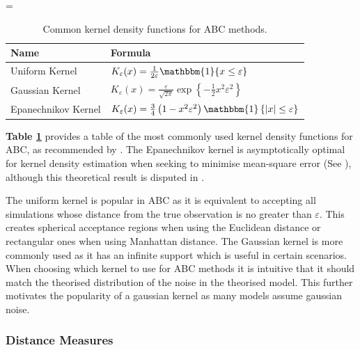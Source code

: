 \documentclass[11pt,a4paper]{article}
\theoremstyle{break}
\begin{document}
  \begin{table}[H]
    \everymath={\displaystyle}
    \centering
    \begin{tabular}{|l|l|}
      \hline
      \textbf{Name}&\textbf{Formula}\\\hline
      Uniform Kernel&$K_\varepsilon(x)=\frac1{2\varepsilon}\mathbbm{1}\{x\leq\varepsilon\}$\\\hline
      Gaussian Kernel&$K_\varepsilon(x)=\frac\varepsilon{\sqrt{2\pi}}\exp\left\{-\frac12x^2\varepsilon^2\right\}$\\\hline
      Epanechnikov Kernel&$K_\varepsilon(x)=\frac34\left(1-x^2\varepsilon^2\right)\mathbbm{1}\left\{|x|\leq\varepsilon\right\}$\\
      \hline
    \end{tabular}
    \caption{Common kernel density functions for ABC methods.\protect\footnotemark}
    \label{tab_common_kernels}
  \end{table}

  \par \textbf{Table \ref{tab_common_kernels}} provides a table of the most commonly used kernel density functions for ABC, as recommended by \cite[]{annual_review_of_statistics_ABC}. The Epanechnikov kernel is asymptotically optimal for kernel density estimation when seeking to minimise mean-square error (See \cite[]{non_parameteric_estimation_of_a_multivariate_probability_density}), although this theoretical result is disputed in \cite[]{introduction_to_nonparametric_estimation}.

  \par The uniform kernel is popular in ABC as it is equivalent to accepting all simulations whose distance from the true observation is no greater than $\varepsilon$. This creates spherical acceptance regions when using the Euclidean distance or rectangular ones when using Manhattan distance. The Gaussian kernel is more commonly used as it has an infinite support which is useful in certain scenarios. When choosing which kernel to use for ABC methods it is intuitive that it should match the theorised distribution of the noise in the theorised model. This further motivates the popularity of a gaussian kernel as many models assume gaussian noise.

\subsubsection*{Distance Measures}\label{sec_distance_measures}
\end{document}
